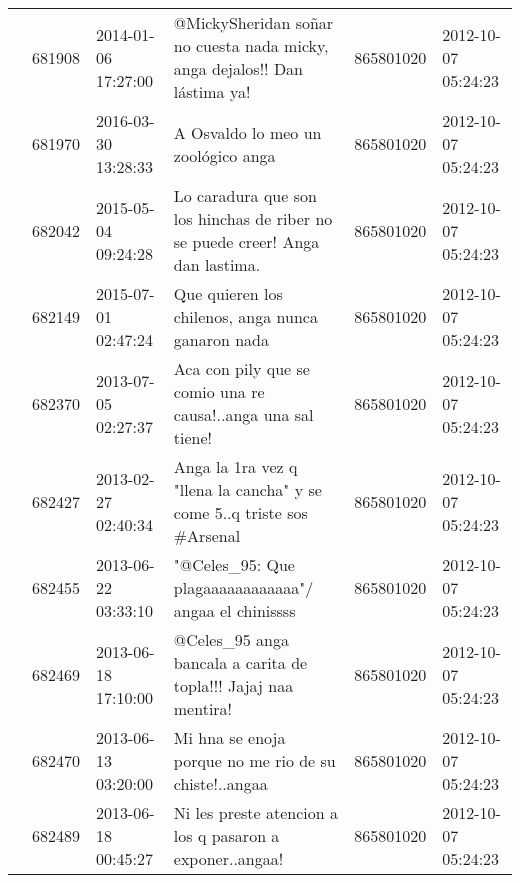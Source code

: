 \begin{tabular}{llllrl}
           & 681908  & 2014-01-06 17:27:00 &                                                                    @MickySheridan soñar no cuesta nada micky, anga dejalos!! Dan lástima ya! &   865801020 & 2012-10-07 05:24:23 \\
           & 681970  & 2016-03-30 13:28:33 &                                                                                                           A Osvaldo lo meo un zoológico anga &   865801020 & 2012-10-07 05:24:23 \\
           & 682042  & 2015-05-04 09:24:28 &                                                               Lo caradura que son los hinchas de riber  no se puede creer! Anga dan lastima. &   865801020 & 2012-10-07 05:24:23 \\
           & 682149  & 2015-07-01 02:47:24 &                                                                                            Que quieren los chilenos, anga nunca ganaron nada &   865801020 & 2012-10-07 05:24:23 \\
           & 682370  & 2013-07-05 02:27:37 &                                                                                 Aca con pily que se comio una re causa!..anga una sal tiene! &   865801020 & 2012-10-07 05:24:23 \\
           & 682427  & 2013-02-27 02:40:34 &                                                                       Anga la 1ra vez q "llena la cancha" y se come 5..q triste sos \#Arsenal &   865801020 & 2012-10-07 05:24:23 \\
           & 682455  & 2013-06-22 03:33:10 &                                                                                        "@Celes\_95: Que plagaaaaaaaaaaaa"/ angaa el chinissss &   865801020 & 2012-10-07 05:24:23 \\
           & 682469  & 2013-06-18 17:10:00 &                                                                               @Celes\_95 anga bancala a carita de topla!!! Jajaj naa mentira! &   865801020 & 2012-10-07 05:24:23 \\
           & 682470  & 2013-06-13 03:20:00 &                                                                                        Mi hna se enoja porque no me rio de su chiste!..angaa &   865801020 & 2012-10-07 05:24:23 \\
           & 682489  & 2013-06-18 00:45:27 &                                                                                     Ni les preste atencion a los q pasaron a exponer..angaa! &   865801020 & 2012-10-07 05:24:23 \\

\end{tabular}
